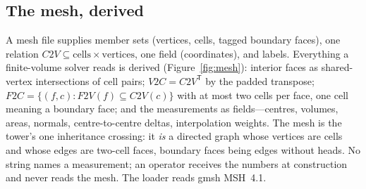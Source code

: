 \documentclass[11pt,a4paper]{article}
\newcommand{\tr}{^{\mathsf T}}
\begin{document}
\subsection{The mesh, derived}\label{sec:mesh}

A mesh file supplies member sets (vertices, cells, tagged boundary faces), one relation $C2V\subseteq \text{cells}\times\text{vertices}$, one field (coordinates), and labels. Everything a finite-volume solver reads is derived (Figure~\ref{fig:mesh}): interior faces as shared-vertex intersections of cell pairs; $V2C = C2V\tr$ by the padded transpose; $F2C = \{(f,c): F2V(f)\subseteq C2V(c)\}$ with at most two cells per face, one cell meaning a boundary face; and the measurements as fields---centres, volumes, areas, normals, centre-to-centre deltas, interpolation weights. The mesh is the tower's one inheritance crossing: it \emph{is} a directed graph whose vertices are cells and whose edges are two-cell faces, boundary faces being edges without heads. No string names a measurement; an operator receives the numbers at construction and never reads the mesh. The loader reads gmsh MSH~4.1.
\end{document}
